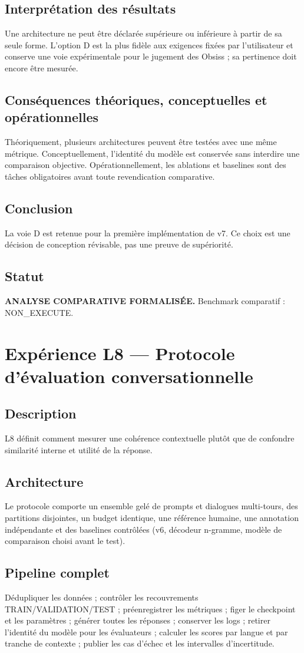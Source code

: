 \documentclass[11pt,a4paper]{report}
\begin{document}
\section{Interprétation des résultats}
Une architecture ne peut être déclarée supérieure ou inférieure à partir de sa seule forme. L'option D est la plus fidèle aux exigences fixées par l'utilisateur et conserve une voie expérimentale pour le jugement des Obsiss ; sa pertinence doit encore être mesurée.
\section{Conséquences théoriques, conceptuelles et opérationnelles}
Théoriquement, plusieurs architectures peuvent être testées avec une même métrique. Conceptuellement, l'identité du modèle est conservée sans interdire une comparaison objective. Opérationnellement, les ablations et baselines sont des tâches obligatoires avant toute revendication comparative.
\section{Conclusion}
La voie D est retenue pour la première implémentation de v7. Ce choix est une décision de conception révisable, pas une preuve de supériorité.
\section{Statut}
\textbf{ANALYSE COMPARATIVE FORMALISÉE.} Benchmark comparatif : NON\_EXECUTE.

\chapter{Expérience L8 — Protocole d'évaluation conversationnelle}
\section{Description}
L8 définit comment mesurer une cohérence contextuelle plutôt que de confondre similarité interne et utilité de la réponse.
\section{Architecture}
Le protocole comporte un ensemble gelé de prompts et dialogues multi-tours, des partitions disjointes, un budget identique, une référence humaine, une annotation indépendante et des baselines contrôlées (v6, décodeur n-gramme, modèle de comparaison choisi avant le test).
\section{Pipeline complet}
Dédupliquer les données ; contrôler les recouvrements TRAIN/VALIDATION/TEST ; préenregistrer les métriques ; figer le checkpoint et les paramètres ; générer toutes les réponses ; conserver les logs ; retirer l'identité du modèle pour les évaluateurs ; calculer les scores par langue et par tranche de contexte ; publier les cas d'échec et les intervalles d'incertitude.
\end{document}
